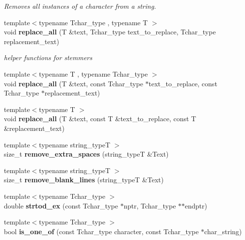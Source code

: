 \begin{DoxyCompactItemize}
\begin{DoxyCompactList}\small\item\em Removes all instances of a character from a string. \end{DoxyCompactList}\item 
{\footnotesize template$<$typename Tchar\+\_\+type , typename T $>$ }\\void {\bf replace\+\_\+all} (T \&text, Tchar\+\_\+type text\+\_\+to\+\_\+replace, Tchar\+\_\+type replacement\+\_\+text)\label{namespacestring__util_a10ec640d61f1209f2e47cd91504061d3}

\begin{DoxyCompactList}\small\item\em helper functions for stemmers \end{DoxyCompactList}\item 
{\footnotesize template$<$typename T , typename Tchar\+\_\+type $>$ }\\void {\bfseries replace\+\_\+all} (T \&text, const Tchar\+\_\+type $\ast$text\+\_\+to\+\_\+replace, const Tchar\+\_\+type $\ast$replacement\+\_\+text)\label{namespacestring__util_a066971cc89a67e380df6098d90237ff2}

\item 
{\footnotesize template$<$typename T $>$ }\\void {\bfseries replace\+\_\+all} (T \&text, const T \&text\+\_\+to\+\_\+replace, const T \&replacement\+\_\+text)\label{namespacestring__util_abd789a33fdd13f1b7de04904d164d413}

\item 
{\footnotesize template$<$typename string\+\_\+typeT $>$ }\\size\+\_\+t {\bf remove\+\_\+extra\+\_\+spaces} (string\+\_\+typeT \&Text)
\item 
{\footnotesize template$<$typename string\+\_\+typeT $>$ }\\size\+\_\+t {\bf remove\+\_\+blank\+\_\+lines} (string\+\_\+typeT \&Text)
\item 
{\footnotesize template$<$typename Tchar\+\_\+type $>$ }\\double {\bf strtod\+\_\+ex} (const Tchar\+\_\+type $\ast$nptr, Tchar\+\_\+type $\ast$$\ast$endptr)
\item 
{\footnotesize template$<$typename Tchar\+\_\+type $>$ }\\bool {\bfseries is\+\_\+one\+\_\+of} (const Tchar\+\_\+type character, const Tchar\+\_\+type $\ast$char\+\_\+string)\label{namespacestring__util_a2c2a992607751ea675fb9e45c348a71d}

\end{DoxyCompactItemize}


